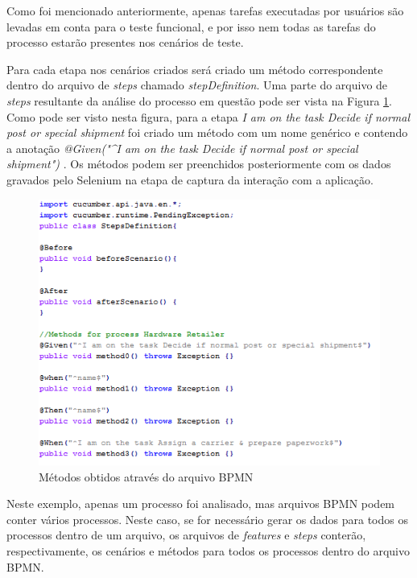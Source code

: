 \documentclass[12pt]{article}
\begin{document}
Como foi mencionado anteriormente, apenas tarefas executadas por usuários são levadas em conta para o teste funcional, e por isso nem todas as tarefas do processo estarão presentes nos cenários de teste.


Para cada etapa nos cenários criados será criado um método correspondente dentro do arquivo de \emph{steps} chamado \emph{stepDefinition}. Uma parte do arquivo de \emph{steps} resultante da análise do processo em questão pode ser vista na Figura \ref{fig:steps_resultado}. Como pode ser visto nesta figura, para a etapa \emph{I am on the task Decide if normal post or special shipment} foi criado um método com um nome genérico e contendo a anotação \emph{@Given("\^{}I am on the task Decide if normal post or special shipment\textdollar{}") 
}. Os métodos podem ser preenchidos posteriormente com os dados gravados pelo Selenium na etapa de captura da interação com a aplicação.

\begin{figure}[ht]
\includegraphics[width=.8\paperwidth]{figuras/steps.png}
\caption{Métodos obtidos através do arquivo BPMN}
\label{fig:steps_resultado}
\end{figure}

Neste exemplo, apenas um processo foi analisado, mas arquivos BPMN podem conter vários processos. Neste caso, se for necessário gerar os dados para todos os processos dentro de um arquivo, os arquivos de \emph{features} e \emph{steps} conterão, respectivamente, os cenários e métodos para todos os processos dentro do arquivo BPMN. 
\end{document}
